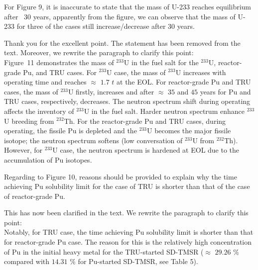 \documentclass[answers,11pt]{exam}
\begin{document}
\begin{questions}
        \question For Figure 9, it is inaccurate to state that the mass of U-233 reaches equilibrium after ~30 years, apparently from the figure, we can observe that the mass of U-233 for three of the cases still increase/decrease after 30 years.
        
        \begin{solution}
                Thank you for the excellent point. The statement has been removed from the text.
                Moreover, we rewrite the paragraph to clarify this point:\\
                
                Figure~11 demonstrates the mass of $^{233}$U in the fuel salt for the $^{233}$U, reactor-grade Pu, and TRU cases. For $^{233}$U case, the mass of $^{233}$U increases with operating time and reaches $\approx$ $1.7$ $t$ at the EOL. For reactor-grade Pu and TRU cases, the mass of $^{233}$U firstly, increases and after $\approx$ $35$ and $45$ years for Pu and TRU cases, respectively, decreases. The neutron spectrum shift during operating affects the inventory of $^{233}$U in the fuel salt. Harder neutron spectrum enhance $^{233}$U breeding from $^{232}$Th. For the reactor-grade Pu and TRU cases, during operating, the fissile Pu is depleted and the $^{233}$U becomes the major fissile isotope; the neutron spectrum softens (low conversation of $^{233}$U from $^{232}$Th). However, for $^{233}$U case, the neutron spectrum is hardened at EOL due to the accumulation of Pu isotopes.                
                
        \end{solution}

        \question Regarding to Figure 10, reasons should be provided to explain why the time achieving Pu solubility limit for the case of TRU is shorter than that of the case of reactor-grade Pu.
        \begin{solution}
                 This has now been clarified in the text.
                 We rewrite the paragraph to clarify this point:\\
                 
                 Notably, for TRU case, the time achieving Pu solubility limit is shorter than that for reactor-grade Pu case. The reason for this is the relatively high concentration of Pu in the initial heavy metal for the TRU-started SD-TMSR ($\approx$ $29.26$ \% compared with $14.31$ \% for Pu-started SD-TMSR, see Table 5).
                 

\end{solution}
\end{questions}
\end{document}
